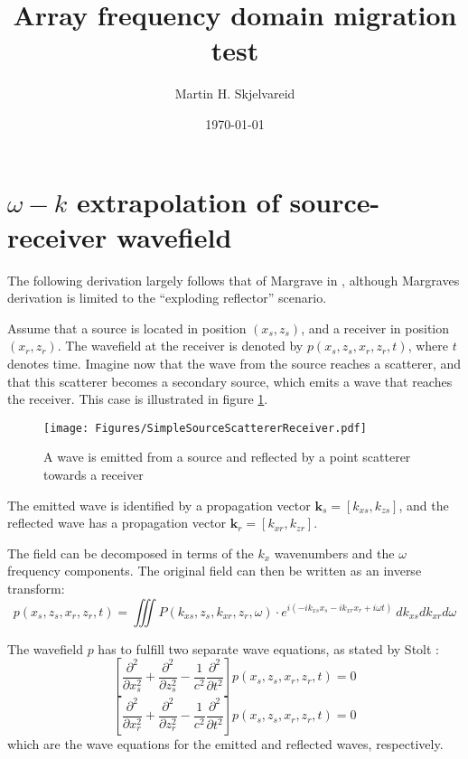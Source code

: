 \documentclass{article}%
\begin{document}
\title{Array frequency domain migration test}
\author{Martin H. Skjelvareid}
\date{\today}
\maketitle

\section{$\omega-k$ extrapolation of source-receiver wavefield}
\label{sec:GeneralDerivation}
The following derivation largely follows that of Margrave in \cite{Margrave2003}, although Margraves derivation is limited to the ``exploding reflector'' scenario.

Assume that a source is located in position $(x_s,z_s)$, and a receiver in position $(x_r,z_r)$. The wavefield at the receiver is denoted by $p(x_s,z_s,x_r,z_r,t)$, where $t$ denotes time. Imagine now that the wave from the source reaches a scatterer, and that this scatterer becomes a secondary source, which emits a wave that reaches the receiver. This case is illustrated in figure \ref{fig:SimpleSourceScattererReceiver}.
\begin{figure}
	\centering
		\texttt{[image: Figures/SimpleSourceScattererReceiver.pdf]}
	\caption{A wave is emitted from a source and reflected by a point scatterer towards a receiver}
	\label{fig:SimpleSourceScattererReceiver}
\end{figure}


The emitted wave is identified by a propagation vector $\bm{k}_s = [k_{xs}, k_{zs}]$, and the reflected wave has a propagation vector $\bm{k}_r = [k_{xr},k_{zr}]$.   

The field can be decomposed in terms of the $k_x$ wavenumbers and the $\omega$ frequency components. The original field can then be written as an inverse transform:
\begin{equation}
	p(x_s,z_s,x_r,z_r,t) = \iiint P(k_{xs},z_s,k_{xr},z_r,\omega) 
		\cdot e^{i\left(-ik_{xs}x_s -ik_{xr}x_r +i\omega t \right)} \ dk_{xs} dk_{xr} d\omega
\label{eq:inverseTransformedField}
\end{equation}

The wavefield $p$ has to fulfill two separate wave equations, as stated by Stolt \cite{Stolt1978}:
\begin{equation}
	\left[\frac{\partial^2}{\partial x_s^2} + \frac{\partial^2}{\partial z_s^2} - 
		\frac{1}{c^2} \frac{\partial^2}{\partial t^2} \right] p(x_s,z_s,x_r,z_r,t)  = 0
\label{eq:waveEqS}
\end{equation}
\begin{equation}
	\left[\frac{\partial^2}{\partial x_r^2} + \frac{\partial^2}{\partial z_r^2} - 
		\frac{1}{c^2} \frac{\partial^2}{\partial t^2} \right] p(x_s,z_s,x_r,z_r,t)  = 0
\label{eq:waveEqR}
\end{equation}
which are the wave equations for the emitted and reflected waves, respectively. 
\end{document}
